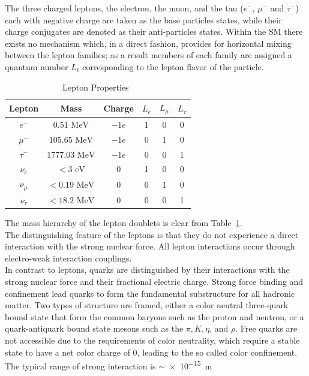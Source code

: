 %
The three charged leptons, the electron, the muon, and the tau ($e^-$, $\mu^-$ and $\tau^-$) each with negative charge are taken as the base particles states, while their charge conjugates are denoted as their anti-particles states.  Within the SM there exists no mechanism which, in a direct fashion, provides for horizontal mixing between the   lepton families; as a result members of each family are assigned a  quantum number $L_{\ell}$ corresponding to the lepton flavor of the particle.
\begin{table}
	\begin{center}
		\begin{tabular}{|c|c|c| c c c|}
			\hline
				Lepton        & Mass           & Charge & $L_{e}$ & $L_{\mu}$ & $L_{\tau}$ \\
			\hline
				$e^{-}$      & $0.51 \mbox{ MeV}$     & $-1 e$ & 1       & 0         & 0 \\
				$\mu^{-}$    & $105.65 \mbox{ MeV}$   & $-1 e$ & 0       & 1         & 0 \\
				$\tau^{-}$   & $1777.03 \mbox{ MeV}$  & $-1 e$ & 0       & 0         & 1 \\
			\hline
				$\nu_{e}$    & $< 3 \mbox{ eV}$       & $0$    & 1       & 0         & 0 \\
				$\nu_{\mu}$  & $< 0.19 \mbox{ MeV}$   & $0$    & 0       & 1         & 0 \\
				$\nu_{\tau}$ & $< 18.2 \mbox{ MeV}$   & $0$    & 0       & 0         & 1 \\
			\hline
		\end{tabular}
		\caption{Lepton Properties~\cite{PDG}}
		\label{table:lepton_properties}
	\end{center}
\end{table}
The mass hierarchy of the lepton doublets is clear from Table~\ref{table:lepton_properties}.\\
The distinguishing feature of the leptons is that they do not experience a direct interaction with the strong nuclear force. All lepton interactions occur through  electro-weak interaction couplings. \\%
In contrast to leptons, quarks are distinguished by their interactions with the strong nuclear force and their fractional electric charge. Strong force   binding and confinement lead quarks to form the fundamental substructure for all hadronic matter. Two types of structure are framed, either a color neutral three-quark bound state that form the common baryons such as the proton and neutron, or a quark-antiquark bound state mesons such as the $\pi,K,\eta$, and $\rho$. Free quarks are not accessible due to the requirements of color neutrality, which require a stable state to have a net color charge of 0, leading to the so called color confinement. The typical range of strong interaction is $\sim$\SI{e-15}{\meter}\\
